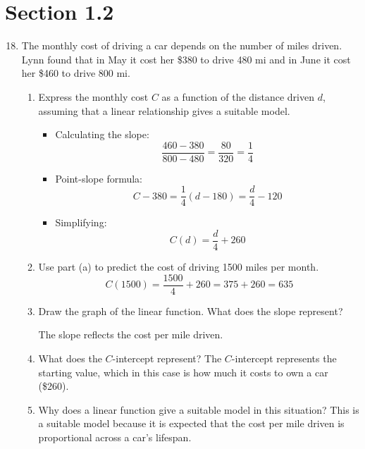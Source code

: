 \documentclass{article}
\begin{document}
\section{Section 1.2}
\begin{enumerate}
\setcounter{enumi}{17}
	\item The monthly cost of driving a car depends on the number of miles driven. Lynn found that in May it cost her \$380 to drive 480 mi and in June it cost her \$460 to drive 800 mi.
	\begin{enumerate}
		\item Express the monthly cost $C$ as a function of the distance driven $d$, assuming that a linear relationship gives a suitable model.
		\newline 
		\begin{itemize}
			\item Calculating the slope: $$\frac{460-380}{800-480}=\frac{80}{320}=\frac{1}{4}$$
			\item Point-slope formula: $$C-380=\frac{1}{4}(d-180)=\frac{d}{4}-120$$
			\item Simplifying: $$C(d)=\frac{d}{4}+260$$
		\end{itemize}
		\item Use part (a) to predict the cost of driving 1500 miles per month.
		$$C(1500)=\frac{1500}{4}+260=375+260=635$$
		\item Draw the graph of the linear function. What does the slope represent?
		\begin{center}
			\pgfplotsset{compat=1.6,width=0.6\linewidth,height=7cm}
		\end{center}
		The slope reflects the cost per mile driven.
		\item What does the $C$-intercept represent?\newline
		The $C$-intercept represents the starting value, which in this case is how much it costs to own a car (\$260).
		\item Why does a linear function give a suitable model in this situation?\newline
		This is a suitable model because it is expected that the cost per mile driven is proportional across a car's lifespan.
	\end{enumerate}
\end{enumerate}
\end{document}
